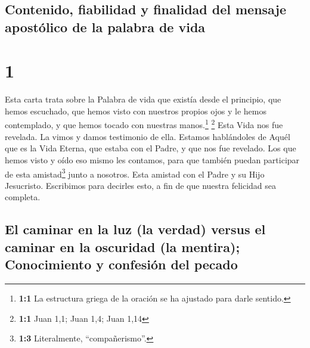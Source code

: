 \hypertarget{contenido-fiabilidad-y-finalidad-del-mensaje-apostuxf3lico-de-la-palabra-de-vida}{%
\subsection{Contenido, fiabilidad y finalidad del mensaje apostólico de
la palabra de
vida}\label{contenido-fiabilidad-y-finalidad-del-mensaje-apostuxf3lico-de-la-palabra-de-vida}}

\hypertarget{section}{%
\section{1}\label{section}}

 Esta carta trata sobre la Palabra de vida que existía
desde el principio, que hemos escuchado, que hemos visto con nuestros
propios ojos y le hemos contemplado, y que hemos tocado con nuestras
manos.\footnote{\textbf{1:1} La estructura griega de la oración se ha
  ajustado para darle sentido.} \footnote{\textbf{1:1} Juan 1,1; Juan
  1,4; Juan 1,14}  Esta Vida nos fue revelada. La vimos y
damos testimonio de ella. Estamos hablándoles de Aquél que es la Vida
Eterna, que estaba con el Padre, y que nos fue revelado. 
Los que hemos visto y oído eso mismo les contamos, para que también
puedan participar de esta amistad\footnote{\textbf{1:3} Literalmente,
  ``compañerismo''.} junto a nosotros. Esta amistad con el Padre y su
Hijo Jesucristo.  Escribimos para decirles esto, a fin de
que nuestra felicidad sea completa.

\hypertarget{el-caminar-en-la-luz-la-verdad-versus-el-caminar-en-la-oscuridad-la-mentira-conocimiento-y-confesiuxf3n-del-pecado}{%
\subsection{El caminar en la luz (la verdad) versus el caminar en la
oscuridad (la mentira); Conocimiento y confesión del
pecado}\label{el-caminar-en-la-luz-la-verdad-versus-el-caminar-en-la-oscuridad-la-mentira-conocimiento-y-confesiuxf3n-del-pecado}}

